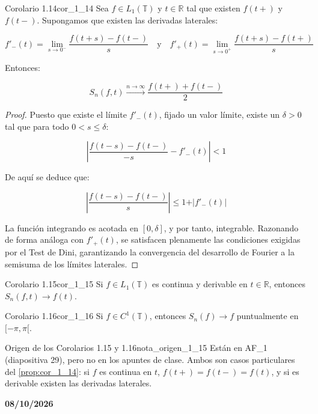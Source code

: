 \begin{proposicion}{Corolario 1.14}{cor_1_14}
Sea $f \in L_1(\mathbb{T})$ y $t \in \mathbb{R}$ tal que existen $f(t+)$ y $f(t-)$. Supongamos que existen las derivadas laterales:


$$f'_-(t) = \lim_{s \to 0^-} \frac{f(t+s) - f(t-)}{s} \quad \text{y} \quad f'_+(t) = \lim_{s \to 0^+} \frac{f(t+s) - f(t+)}{s}$$


Entonces:


$$S_n(f,t) \xrightarrow{n \to \infty} \frac{f(t+) + f(t-)}{2}$$


\end{proposicion}

\begin{proof}
Puesto que existe el límite $f'_-(t)$, fijado un valor límite, existe un $\delta > 0$ tal que para todo $0 < s \le \delta$:


$$\left\vert{} \frac{f(t-s) - f(t-)}{-s} - f'_-(t) \right\vert{} < 1$$


De aquí se deduce que:


$$\left\vert{} \frac{f(t-s) - f(t-)}{s} \right\vert{} \le 1 + \vert{}f'_-(t)\vert{}$$


La función integrando es acotada en $[0, \delta]$, y por tanto, integrable. Razonando de forma análoga con $f'_+(t)$, se satisfacen plenamente las condiciones exigidas por el Test de Dini, garantizando la convergencia del desarrollo de Fourier a la semisuma de los límites laterales.
\end{proof}

\begin{proposicion}{Corolario 1.15}{cor_1_15}
Si $f \in L_1(\mathbb{T})$ es continua y derivable en $t \in \mathbb{R}$, entonces $S_n(f, t) \to f(t)$.
\end{proposicion}

\begin{proposicion}{Corolario 1.16}{cor_1_16}
Si $f \in C^1(\mathbb{T})$, entonces $S_n(f) \to f$ puntualmente en $[-\pi, \pi[$.
\end{proposicion}

\begin{nota}{Origen de los Corolarios 1.15 y 1.16}{nota_origen_1_15}
Están en AF\_1 (diapositiva 29), pero no en los apuntes de clase. Ambos son casos particulares del \cref{prop:cor_1_14}: si $f$ es continua en $t$, $f(t+) = f(t-) = f(t)$, y si es derivable existen las derivadas laterales.
\end{nota}

\textbf{08/10/2026}

